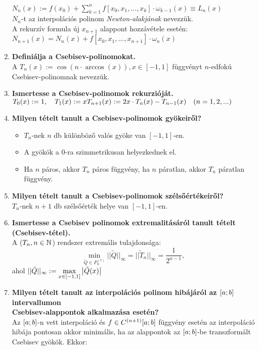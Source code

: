 \documentclass{article}
\begin{document}
\begin{enumerate}
	{\Large $N_n(x):=f(x_0)+\sum\limits_{k=1}^nf[x_0,x_1,...,x_k]\cdot\omega_{k-1}(x)
	\equiv L_n(x)$}\\[0.2cm]
	$N_n$-t az interpolációs polinom \textit{Newton-alakjának} nevezzük.\\[0.1cm]
	A rekurzív formula új $x_{n+1}$ alappont hozzávétele esetén:\\[0.2cm]
	{\Large $N_{n+1}(x)=N_n(x)+f[x_0,x_1,...,x_{n+1}]\cdot\omega_n(x)$}
	\item\textbf{Definiálja a Csebisev-polinomokat.}\\[0.2cm]
	A $T_n(x):=\cos(n\cdot\arccos(x)),x\in[-1,1]$ függvényt $n$-edfokú
	Csebisev-polinomnak nevezzük.
	\item\textbf{Ismertesse a Csebisev-polinomok rekurzióját.}\\[0.1cm]
	$T_0(x):=1,\quad T_1(x):=x\\[0.2cm]T_{n+1}(x):=2x\cdot T_n(x)-T_{n-1}(x)\quad
	(n=1,2,...)$
	\item\textbf{Milyen tételt tanult a Csebisev-polinomok gyökeiről?}
	\begin{itemize}
		\item $T_n$-nek $n$ db különböző valós gyöke van $[-1,1]$-en.
		\item A gyökök a 0-ra szimmetrikusan helyezkednek el.
		\item Ha $n$ páros, akkor $T_n$ páros függvény, ha $n$ páratlan, akkor $T_n$
		páratlan függvény.
	\end{itemize}
	\item\textbf{Milyen tételt tanult a Csebisev-polinomok szélsőértékeiről?}\\[0.2cm]
	$T_n$-nek $n+1$ db szélsőérték helye van $[-1,1]$-en.
	\item\textbf{Ismertesse a Csebisev polinomok extremalitásáról tanult tételt (Csebisev-tétel).}\\[0.1cm]
	A ($T_n,n\in\mathbb{N}$) rendszer extremális tulajdonsága:	
	\[\min\limits_{\tilde{Q}\in P_n^{(1)}}||\tilde{Q}||_{\infty}=||\tilde{T}_n|
	|_{\infty}=\frac{1}{2^{n-1}},\]
	ahol $||\tilde{Q}||_{\infty}:=\max\limits_{x\in[-1,1]}\abs{\tilde{Q}(x)}$
	\newpage
	\item\textbf{Milyen tételt tanult az interpolációs polinom hibájáról az $[a;b]$ intervallumon \\ Csebisev-alappontok alkalmazása esetén?}\\[0.1cm]
	Az $[a;b]$-n vett interpoláció és $f\in C^{(n+1)}[a;b]$ függvény esetén az
	interpoláció hibája pontosan akkor minimális, ha az alappontok az $[a;b]$-be
	transzformált Csebisev gyökök. Ekkor:

\end{enumerate}
\end{document}
